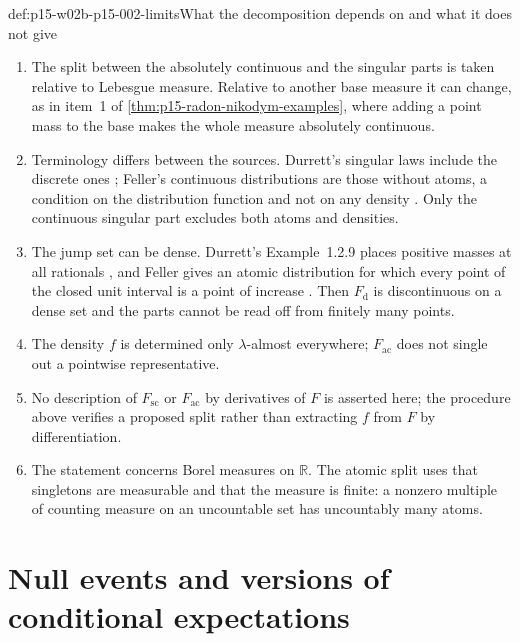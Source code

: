 \begin{hbwarning}{def:p15-w02b-p15-002-limits}{What the decomposition depends on and what it does not give}
\begin{enumerate}
\item The split between the absolutely continuous and the singular parts
      is taken relative to Lebesgue measure. Relative to another base
      measure it can change, as in item~1 of
      \cref{thm:p15-radon-nikodym-examples}, where adding a point mass to
      the base makes the whole measure absolutely continuous.
\item Terminology differs between the sources. Durrett's singular laws
      include the discrete ones \cite[p.~13]{DurrettPTEAuthor2019};
      Feller's continuous distributions are those without atoms, a
      condition on the distribution function and not on any density
      \cite[sec.~V.2, p.~138]{Feller1971ProbabilityII}. Only the
      continuous singular part excludes both atoms and densities.
\item The jump set can be dense. Durrett's Example~1.2.9 places positive
      masses at all rationals \cite[p.~14]{DurrettPTEAuthor2019}, and
      Feller gives an atomic distribution for which every point of the
      closed unit interval is a point of increase
      \cite[sec.~V.2, p.~137]{Feller1971ProbabilityII}. Then
      \(F_{\mathrm d}\) is discontinuous on a dense set and the parts
      cannot be read off from finitely many points.
\item The density \(f\) is determined only \(\lambda\)-almost everywhere;
      \(F_{\mathrm{ac}}\) does not single out a pointwise representative.
\item No description of \(F_{\mathrm{sc}}\) or \(F_{\mathrm{ac}}\) by
      derivatives of \(F\) is asserted here; the procedure above verifies a
      proposed split rather than extracting \(f\) from \(F\) by
      differentiation.
\item The statement concerns Borel measures on \(\mathbb R\). The atomic
      split uses that singletons are measurable and that the measure is
      finite: a nonzero multiple of counting measure on an uncountable set
      has uncountably many atoms.
\end{enumerate}
\end{hbwarning}

\section{Null events and versions of conditional expectations}
\label{sec:p15-w02b-p15-002-null-versions}

